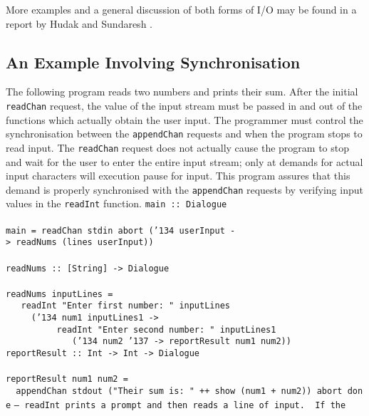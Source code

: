 More examples and a general discussion of both forms of I/O may
be found in a report by Hudak and Sundaresh \cite{hudak:io}.
\pagebreak[4]

\subsection{An Example Involving Synchronisation}

The following program reads two numbers and prints their sum.  After
the initial \mbox{\tt readChan} request, the value of the input stream must be
passed in and out of the functions which actually obtain the user
input.  The programmer must control the synchronisation between the
\mbox{\tt appendChan} requests and when the program stops to read input.  The
\mbox{\tt readChan} request does not actually cause the program to stop and
wait for the user to enter the entire input stream; only at demands
for actual input characters will execution pause for input.  This
program assures that this demand is properly synchronised with the
\mbox{\tt appendChan} requests by verifying input values in the \mbox{\tt readInt}
function.
\bprog
\mbox{\tt main\ ::\ Dialogue}\\
\mbox{\tt }\\[-8pt]
\mbox{\tt main\ =\ readChan\ stdin\ abort\ ({\char'134}\ userInput\ ->\ readNums\ (lines\ userInput))}\\
\mbox{\tt }\\[-8pt]
\mbox{\tt readNums\ ::\ [String]\ ->\ Dialogue}\\
\mbox{\tt }\\[-8pt]
\mbox{\tt readNums\ inputLines\ =}\\
\mbox{\tt \ \ \ readInt\ "Enter\ first\ number:\ "\ inputLines}\\
\mbox{\tt \ \ \ \ \ ({\char'134}\ num1\ inputLines1\ ->}\\
\mbox{\tt \ \ \ \ \ \ \ \ \ \ readInt\ "Enter\ second\ number:\ "\ inputLines1}\\
\mbox{\tt \ \ \ \ \ \ \ \ \ \ \ \ \ ({\char'134}\ num2\ {\char'137}\ ->\ reportResult\ num1\ num2))}\\
\mbox{\tt reportResult\ ::\ Int\ ->\ Int\ ->\ Dialogue}\\
\mbox{\tt }\\[-8pt]
\mbox{\tt reportResult\ num1\ num2\ =}\\
\mbox{\tt \ \ appendChan\ stdout\ ("Their\ sum\ is:\ "\ ++\ show\ (num1\ +\ num2))\ abort\ done}
\eprog
\bprog
\mbox{\tt --\ readInt\ prints\ a\ prompt\ and\ then\ reads\ a\ line\ of\ input.\ \ If\ the}\\
